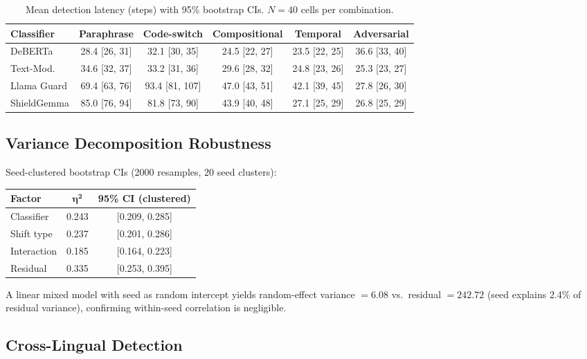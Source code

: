 \documentclass{article}
\begin{document}
\begin{table}[h]
\caption{Mean detection latency (steps) with 95\% bootstrap CIs. $N{=}40$ cells per combination.}
\centering
\small
\begin{tabular}{lccccc}
\toprule
\textbf{Classifier} & \textbf{Paraphrase} & \textbf{Code-switch} & \textbf{Compositional} & \textbf{Temporal} & \textbf{Adversarial} \\
\midrule
DeBERTa & 28.4 [26, 31] & 32.1 [30, 35] & 24.5 [22, 27] & 23.5 [22, 25] & 36.6 [33, 40] \\
Text-Mod. & 34.6 [32, 37] & 33.2 [31, 36] & 29.6 [28, 32] & 24.8 [23, 26] & 25.3 [23, 27] \\
Llama Guard & 69.4 [63, 76] & 93.4 [81, 107] & 47.0 [43, 51] & 42.1 [39, 45] & 27.8 [26, 30] \\
ShieldGemma & 85.0 [76, 94] & 81.8 [73, 90] & 43.9 [40, 48] & 27.1 [25, 29] & 26.8 [25, 29] \\
\bottomrule
\end{tabular}
\end{table}

\subsection{Variance Decomposition Robustness}

Seed-clustered bootstrap CIs (2000 resamples, 20 seed clusters):

\begin{table}[h]
\centering
\small
\begin{tabular}{lcc}
\toprule
\textbf{Factor} & $\boldsymbol{\eta^2}$ & \textbf{95\% CI (clustered)} \\
\midrule
Classifier & 0.243 & [0.209, 0.285] \\
Shift type & 0.237 & [0.201, 0.286] \\
Interaction & 0.185 & [0.164, 0.223] \\
Residual & 0.335 & [0.253, 0.395] \\
\bottomrule
\end{tabular}
\end{table}

A linear mixed model with seed as random intercept yields random-effect variance $= 6.08$ vs.\ residual $= 242.72$ (seed explains 2.4\% of residual variance), confirming within-seed correlation is negligible.

\subsection{Cross-Lingual Detection}
\end{document}

